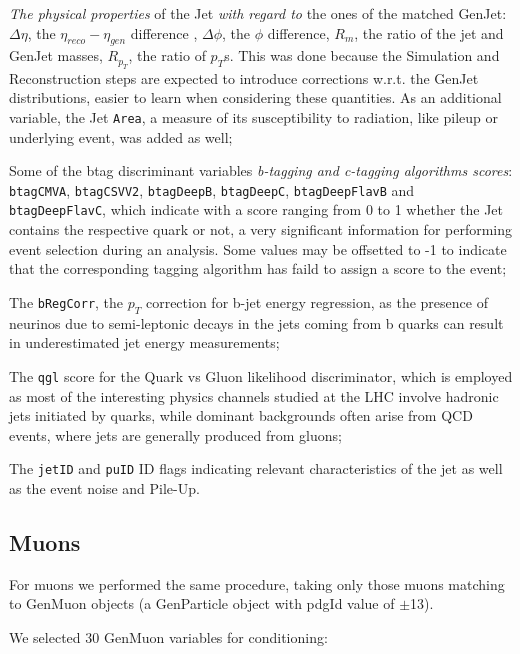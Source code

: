 \begin{outline}
\1 \emph{The physical properties} of the Jet \emph{with regard to} the ones of the matched GenJet: $\Delta\eta$, the $\eta_{reco} - \eta_{gen}$ difference , $\Delta\phi$, the $\phi$ difference, $R_m$, the ratio of the jet and GenJet masses, $R_{p_T}$, the ratio of $p_T$s. This was done because the Simulation and Reconstruction steps are expected to introduce corrections w.r.t. the GenJet distributions, easier to learn when considering these quantities. As an additional variable, the Jet \texttt{Area}, a measure of its susceptibility to radiation, like pileup or underlying event, was added as well;

\1 Some of the btag discriminant variables \emph{b-tagging and c-tagging algorithms scores}: \texttt{btagCMVA}, \texttt{btagCSVV2}, \texttt{btagDeepB}, \texttt{btagDeepC}, \texttt{btagDeepFlavB} and \\\texttt{btagDeepFlavC}, which indicate with a score ranging from 0 to 1 whether the Jet contains the respective quark or not, a very significant information for performing event selection during an analysis. Some values may be offsetted to -1 to indicate that the corresponding tagging algorithm has faild to assign a score to the event;

\1 The \texttt{bRegCorr}, the $p_T$ correction for b-jet energy regression, as the presence of neurinos due to semi-leptonic decays in the jets coming from b quarks can result in underestimated jet energy measurements;

\1 The \texttt{qgl} score for the Quark vs Gluon likelihood discriminator, which is employed as most of the interesting physics channels studied at the LHC involve hadronic jets initiated by quarks, while dominant backgrounds often arise from QCD events, where jets are generally produced from gluons;

\1 The \texttt{jetID} and \texttt{puID} ID flags indicating relevant characteristics of the jet as well as the event noise and Pile-Up.
\end{outline}
\subsection{Muons}

For muons we performed the same procedure, taking only those muons matching to GenMuon objects (a GenParticle object with pdgId value of $\pm$13). 

We selected 30 GenMuon variables for conditioning:

